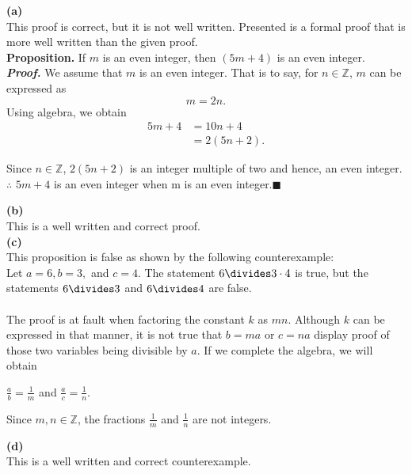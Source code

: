 \documentclass{article}
\begin{document}
\textbf{(a)}\\This proof is correct, but it is not well written. Presented is a formal proof that is more well written than the given proof.\\

\textbf{Proposition.} If $m$ is an even integer, then $(5m + 4)$ is an even integer.\\
\textit{\textbf{Proof.}} We assume that $m$ is an even integer. That is to say, for $n \in \mathbb{Z}$, $m$ can be expressed as \begin{equation*}
m = 2n.
\end{equation*}
Using algebra, we obtain
\begin{align*}
5m + 4 &= 10n + 4\\
&= 2(5n + 2).
\end{align*}

Since $n \in \mathbb{Z}$, $2(5n + 2)$ is an integer multiple of two and hence, an even integer. $\therefore$ $5m + 4$ is an even integer when m is an even integer.\hfill$\blacksquare$

\textbf{(b)}\\
This is a well written and correct proof.\\

\textbf{(c)}\\
This proposition is false as shown by the following counterexample:\\
Let $a = 6, b = 3,$ and $c = 4$. The statement $6 \divides 3 \cdot 4$ is true, but the statements $6 \divides 3$ and $6 \divides 4$ are false.\\ \\
The proof is at fault when factoring the constant $k$ as $mn$. Although $k$ can be expressed in that manner, it is not true that $b = ma$ or $c = na$ display proof of those two variables being divisible by $a$. If we complete the algebra, we will obtain
\begin{center}
$\frac{a}{b} = \frac{1}{m}$ and
$\frac{a}{c} = \frac{1}{n}.$
\end{center}

Since $m, n \in \mathbb{Z}$, the fractions $\frac{1}{m}$ and $\frac{1}{n}$ are not  integers.

\textbf{(d)}\\
This is a well written and correct counterexample.
\end{document}
